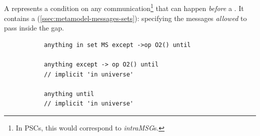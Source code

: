 \subsection{\msequencegap}\label{ssec:metamodel-steps-gaps}

A \msequencegap{} represents a condition on any
communication\footnote{In PSCs, this would correspond to
  \emph{intraMSG}s.} that can happen \emph{before} a \msequenceaction.
It contains a \mmessageset (\cref{ssec:metamodel-messages-sets}):
specifying the messages \emph{allowed} to pass inside the gap.

\begin{figure}[H]
  \begin{subfigure}[c]{\egtextwidth}
    \begin{lstlisting}[style=Example]
anything in set MS except ->op O2() until

anything except -> op O2() until
// implicit 'in universe'

anything until
// implicit 'in universe'
\end{lstlisting}
  \end{subfigure}
  \hfill
  \begin{subfigure}[c]{\eggraphicalwidth}
    \gsecaption
    \centering
  \end{subfigure}
\end{figure}

